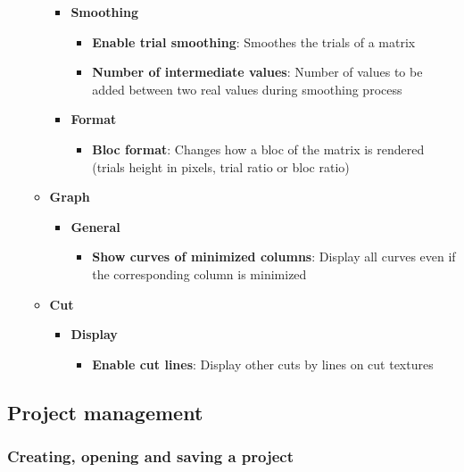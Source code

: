 \documentclass[a4paper]{article}
\begin{document}
\begin{itemize}
\begin{itemize}
\begin{itemize}
\begin{itemize}
\end{itemize}
\item \textbf{Smoothing}
\begin{itemize}
\item \textbf{Enable trial smoothing}: Smoothes the trials of a matrix
\item \textbf{Number of intermediate values}: Number of values to be added between two real values during smoothing process
\end{itemize}
\item \textbf{Format}
\begin{itemize}
\item \textbf{Bloc format}: Changes how a bloc of the matrix is rendered (trials height in pixels, trial ratio or bloc ratio)
\end{itemize}
\end{itemize}
\item \textbf{Graph}
\begin{itemize}
\item \textbf{General}
\begin{itemize}
\item \textbf{Show curves of minimized columns}: Display all curves even if the corresponding column is minimized
\end{itemize}
\end{itemize}
\item \textbf{Cut}
\begin{itemize}
\item \textbf{Display}
\begin{itemize}
\item \textbf{Enable cut lines}: Display other cuts by lines on cut textures
\end{itemize}
\end{itemize}
\end{itemize}
\end{itemize}
\subsection{Project management}
\subsubsection{Creating, opening and saving a project}
\end{document}
